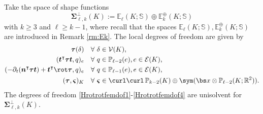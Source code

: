 Take the space of shape functions
\[
\boldsymbol \Sigma_{\ell,k}^{\perp}(K):= \mathbb E_{\ell}(K;\mathbb S)\oplus\mathbb E_k^{\oplus}(K;\mathbb S)
\]
with $k\geq 3$ and $\ell\geq k-1$, where recall that the spaces $\mathbb E_{\ell}(K;\mathbb S), \mathbb E_k^{\oplus}(K;\mathbb S)$ are introduced in Remark \ref{rm:Ek}.
The local degrees of freedom are given by
\begin{align}
\boldsymbol \tau (\delta) & \quad\forall~\delta\in \mathcal V(K), \label{Hrotrotfemdof1}\\
(\boldsymbol  t^{\intercal}\boldsymbol \tau\boldsymbol  t, q)_e & \quad\forall~q\in\mathbb P_{\ell-2}(e),  e\in\mathcal E(K),\label{Hrotrotfemdof2}\\
(-\partial_{t}(\boldsymbol  n^{\intercal}\boldsymbol \tau\boldsymbol  t)+\boldsymbol  t^{\intercal}\rot\boldsymbol \tau, q)_e & \quad\forall~q\in\mathbb P_{\ell-1}(e),  e\in\mathcal E(K),\label{Hrotrotfemdof3}\\
(\boldsymbol \tau, \boldsymbol \varsigma)_K & \quad\forall~\boldsymbol \varsigma\in\curl\curl \, \mathbb P_{k-2}(K)\oplus
 \sym (\bs x\otimes \mathbb P_{\ell-2}(K;\mathbb R^2)).\label{Hrotrotfemdof4}
\end{align}
The degrees of freedom \eqref{Hrotrotfemdof1}-\eqref{Hrotrotfemdof4} are unisolvent for $\boldsymbol \Sigma_{\ell,k}^{\perp}(K)$.


